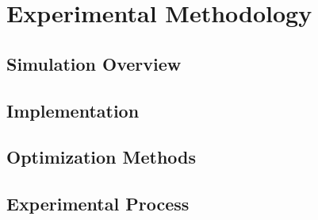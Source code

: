 \chapter{Experimental Methodology}

\section{Simulation Overview}

\section{Implementation}

\section{Optimization Methods}

\section{Experimental Process}
